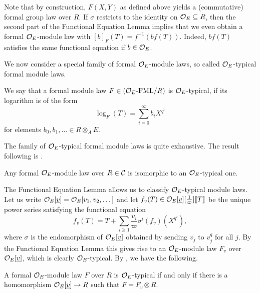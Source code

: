 \documentclass[../main.tex]{subfiles}
\begin{document}
Note that by construction, $F(X,Y)$ as defined above yields a (commutative)
formal group law over $R$. 
If $\sigma$ restricts to the identity on $\mathcal{O}_E \subseteq R$, then 
the second part of the Functional Equation Lemma implies that we even obtain
a formal $\mathcal{O}_E$-module law with $[b]_F(T) = f^{-1}(b f(T))$. Indeed, $bf(T)$
satisfies the same functional equation if $b \in \mathcal{O}_E$. 

We now consider a special family of 
formal $\mathcal{O}_E$-module laws, so called $\mathcal{O}_E$-typical formal module laws.

\begin{defi}\label{def:ATypicFormalModuleLaw}
  We say that a formal module law $F \in {({\mathcal{O}_E}\textnormal-\allowbreak\mathrm{FML}/{R})}$ is 
  $\mathcal{O}_E$-typical, if its logarithm is of the form
  \begin{equation*}
    \log_F(T) = \sum_{i=0}^\infty b_i X^{q^i}
  \end{equation*}
  for elements $b_0, b_1, \dots \in R \otimes_A E$.
\end{defi}

The family of $\mathcal{O}_E$-typical formal module laws is quite exhaustive.
The result following is \cite[21.5.6]{hazewinkel1978formal}.

\begin{lem}\label{lem:AnyOModuleIsIsomorphicToAtypic}
  Any formal $\mathcal{O}_E$-module law over $R \in \mathcal{C}$ is isomorphic to an
  $\mathcal{O}_E$-typical one.
\end{lem}

The Functional Equation Lemma allows us to classify $\mathcal{O}_E$-typical module
laws. Let us write $\mathcal{O}_E[\underline v] = \mathcal{O}_E[v_1, v_2, \dots]$ and let
$f_v(T) \in \mathcal{O}_E[\underline v][\tfrac 1\varpi]\llbracket T \rrbracket$ be the unique power series
satisfying the functional equation
\begin{equation*}
  f_v(T) = T + \sum_{i \geq 1} \frac{v_i}{\varpi} \sigma^i(f_v)(X^{q^i}),
\end{equation*}
where $\sigma$ is the endomorphism of $\mathcal{O}_E[\underline v]$ obtained by
sending $v_j$ to $v_j^q$ for all $j$. By the Functional Equation Lemma
this gives rise to an $\mathcal{O}_E$-module law $F_v$ over $\mathcal{O}_E[\underline v]$,
which is clearly $\mathcal{O}_E$-typical.
By \cite[Definition 21.5.5 and Criterion 21.5.9]{hazewinkel1978formal},
we have the following.

\begin{lem}\label{lem:ClassificationOfAtypicalOnes}
  A formal $\mathcal{O}_E$-module law $F$ over $R$ is $\mathcal{O}_E$-typical if and only if there is
  a homomorphism $\mathcal{O}_E[\underline v] \to R$ such that $F = F_v \otimes R$. 
\end{lem}
\end{document}
